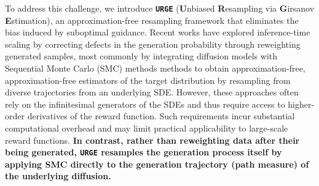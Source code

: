 \documentclass{article}
\theoremstyle{plain}
\theoremstyle{definition}
\theoremstyle{remark}
\renewcommand{\P}{{\mathbb{P}}}
\begin{document}
To address this challenge, we introduce \texttt{\bfseries URGE} (\textbf{U}nbiased \textbf{R}esampling via \textbf{G}irsanov \textbf{E}stimation), an approximation-free resampling framework that eliminates the bias induced by suboptimal guidance. Recent works \cite{chen2025solving,ren2025driftlite,wu2023conditional,skreta2025feynman,lee2025debiasing,he2025rne,zhu2026power,anonymous2026surgeunbiased} have explored inference-time scaling by correcting defects in the generation probability \cite{fan2025physics} through reweighting generated samples, most commonly by integrating diffusion models with Sequential Monte Carlo (SMC) methods \cite{Martino2017_ESS, DelMoral2006_SMC, DelMoral2012_AdaptiveResampling,doucet2000sequential} methods to obtain approximation-free, approximation-free estimators of the target distribution by resampling from diverse trajectories from an underlying SDE. However, these approaches often rely on the infinitesimal generators of the SDEs and thus require access to higher-order derivatives of the reward function. Such requirements incur substantial computational overhead and may limit practical applicability to large-scale reward functions. \textbf{In contrast, rather than reweighting data after their being generated, \texttt{URGE} resamples the generation process itself by applying SMC directly to the generation trajectory (path measure) of the underlying diffusion.} 
\end{document}
